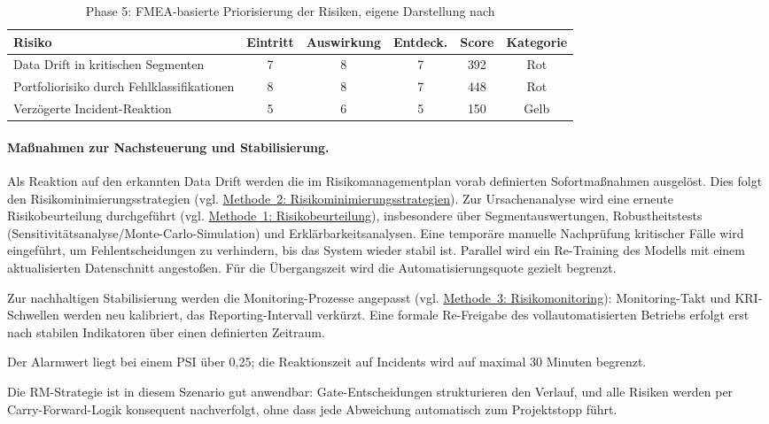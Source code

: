 \begin{table}[!htbp]
\centering
\begin{tabular}{|p{5.5cm}|c|c|c|c|c|}
\hline
\textbf{Risiko} & \textbf{Eintritt} & \textbf{Auswirkung} & \textbf{Entdeck.} & \textbf{Score} & \textbf{Kategorie} \\
\hline
Data Drift in kritischen Segmenten & 7 & 8 & 7 & 392 & Rot \\
Portfoliorisiko durch Fehlklassifikationen & 8 & 8 & 7 & 448 & Rot \\
Verzögerte Incident-Reaktion & 5 & 6 & 5 & 150 & Gelb \\
\hline
\end{tabular}
\caption{Phase 5: FMEA-basierte Priorisierung der Risiken, eigene Darstellung nach \cite{Bundesministerium_2018}}
\label{tab:cs1_phase5_risiken}
\end{table}

\paragraph*{Maßnahmen zur Nachsteuerung und Stabilisierung.}
Als Reaktion auf den erkannten Data Drift
werden die im Risikomanagementplan vorab definierten Sofortmaßnahmen ausgelöst.
Dies folgt den Risikominimierungsstrategien
(vgl. \hyperref[sec:methode2]{Methode~2: Risikominimierungsstrategien}).
Zur Ursachenanalyse wird eine erneute Risikobeurteilung durchgeführt
(vgl. \hyperref[sec:methode1]{Methode~1: Risikobeurteilung}),
insbesondere über Segmentauswertungen,
Robustheitstests (Sensitivitätsanalyse/Monte-Carlo-Simulation)
und Erklärbarkeitsanalysen.
Eine temporäre manuelle Nachprüfung kritischer Fälle wird eingeführt,
um Fehlentscheidungen zu verhindern,
bis das System wieder stabil ist.
Parallel wird ein Re-Training des Modells
mit einem aktualisierten Datenschnitt angestoßen.
Für die Übergangszeit wird die Automatisierungsquote gezielt begrenzt.

Zur nachhaltigen Stabilisierung werden die Monitoring-Prozesse angepasst
(vgl. \hyperref[sec:risiko_monitoring]{Methode~3: Risikomonitoring}):
Monitoring-Takt und KRI-Schwellen werden neu kalibriert,
das Reporting-Intervall verkürzt.
Eine formale Re-Freigabe des vollautomatisierten Betriebs
erfolgt erst nach stabilen Indikatoren über einen definierten Zeitraum.

Der Alarmwert liegt bei einem PSI über 0{,}25; die Reaktionszeit auf Incidents wird auf maximal 30 Minuten begrenzt.

\medskip
\noindent
Die RM-Strategie ist in diesem Szenario gut anwendbar: Gate-Entscheidungen strukturieren den Verlauf,
und alle Risiken werden per Carry-Forward-Logik konsequent nachverfolgt, ohne dass jede Abweichung
automatisch zum Projektstopp führt.


